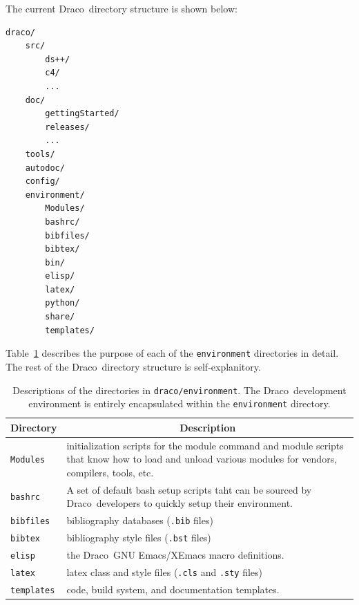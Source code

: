 \documentclass[note]{ResearchNote_pdf}
\newcommand{\draco}{Draco}
\newcommand{\tableText}[1]{{\raggedright #1}}
\begin{document}
The current \draco\ directory structure is shown below:
\begin{lstlisting}[basicstyle=\footnotesize, xleftmargin=2.0in, 
  xrightmargin=2.0in]
draco/
    src/
        ds++/
        c4/
        ...
    doc/
        gettingStarted/
        releases/
        ...
    tools/
    autodoc/
    config/
    environment/
        Modules/
        bashrc/
        bibfiles/
        bibtex/
        bin/
        elisp/
        latex/
        python/
        share/
        templates/
\end{lstlisting}
Table~\ref{tab:envdir} describes the purpose of each of the
\texttt{environment} directories in detail.  The rest of the
\draco\ directory structure is self-explanitory.
\begin{table}[!ht]
  \caption{
    Descriptions of the directories in \texttt{draco/environment}.
    The \draco\ development environment is entirely encapsulated
    within the \texttt{environment} directory.
  }
  \label{tab:envdir}
  \begin{center}
    \begin{tabular}{lp{3in}}\hline\hline
      \multicolumn{1}{c}{Directory} & 
      \multicolumn{1}{c}{Description} \\ \hline
      
      \texttt{Modules} & \tableText{initialization scripts for the
        module command and module scripts that know how to load and
        unload various modules for vendors, compilers, tools, etc.} \\
      
      \texttt{bashrc} & \tableText{A set of default bash setup scripts
        taht can be sourced by \draco\ developers to quickly setup
        their environment.} \\

      \texttt{bibfiles} & \tableText{bibliography databases
        (\texttt{.bib} files)} \\ 
      
      \texttt{bibtex} & \tableText{bibliography style files
        (\texttt{.bst} files)} \\
      
      \texttt{elisp} & \tableText{the \draco\ GNU Emacs/XEmacs macro
        definitions.} \\
      
      \texttt{latex} & \tableText{latex class and style files
        (\texttt{.cls} and \texttt{.sty} files)} \\ 

      \texttt{templates} & \tableText{code, build system, and
        documentation templates.} \\

      \hline\hline
    \end{tabular}
  \end{center}
\end{table}
\end{document}

